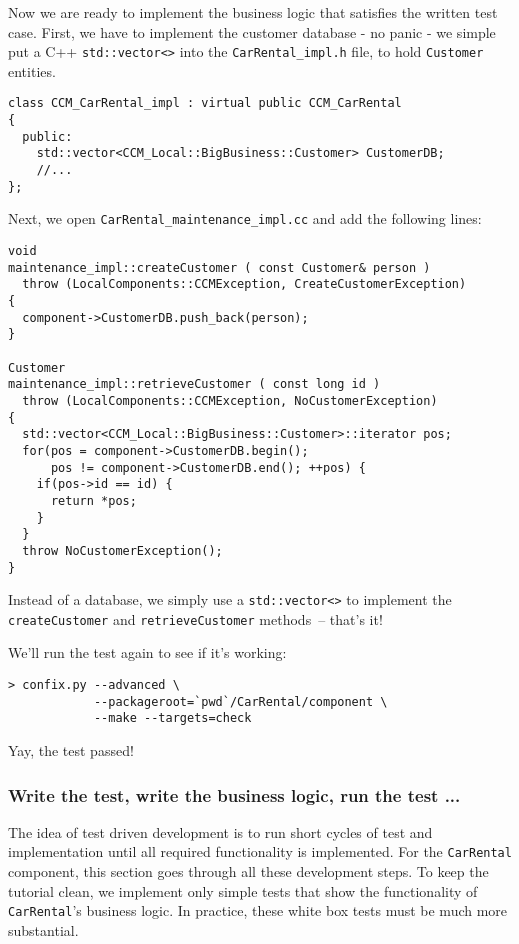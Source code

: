 Now we are ready to implement the business logic that satisfies the written 
test case. 
First, we have to implement the customer database - no panic - we 
simple put a C++ {\tt std::vector<>} into the {\tt CarRental\_impl.h} file,
to hold {\tt Customer} entities.

\begin{small}
\begin{verbatim}
class CCM_CarRental_impl : virtual public CCM_CarRental
{
  public:
    std::vector<CCM_Local::BigBusiness::Customer> CustomerDB;
    //...
};
\end{verbatim}
\end{small}

Next, we open {\tt CarRental\_maintenance\_impl.cc} and add the following lines:
\begin{small}
\begin{verbatim}
void
maintenance_impl::createCustomer ( const Customer& person )
  throw (LocalComponents::CCMException, CreateCustomerException)
{
  component->CustomerDB.push_back(person);
}

Customer
maintenance_impl::retrieveCustomer ( const long id )
  throw (LocalComponents::CCMException, NoCustomerException)
{
  std::vector<CCM_Local::BigBusiness::Customer>::iterator pos;
  for(pos = component->CustomerDB.begin(); 
      pos != component->CustomerDB.end(); ++pos) {
    if(pos->id == id) {
      return *pos;
    }
  }
  throw NoCustomerException();
}
\end{verbatim}
\end{small}

Instead of a database, we simply use a {\tt std::vector<>} to implement
the {\tt createCustomer} and {\tt retrieveCustomer} methods~-- that's it! 

We'll run the test again to see if it's working:
\begin{small}
\begin{verbatim}
> confix.py --advanced \
            --packageroot=`pwd`/CarRental/component \
            --make --targets=check
\end{verbatim}
\end{small}

Yay, the test passed!



\subsubsection{Write the test, write the business logic, run the test ...}
The idea of test driven development is to run short cycles of test and
implementation until all required functionality is implemented.
For the {\tt CarRental} component, this section goes through all these 
development steps. 
To keep the tutorial clean, we implement only simple tests that show the
functionality of {\tt CarRental}'s business logic.
In practice, these white box tests must be much more substantial.

